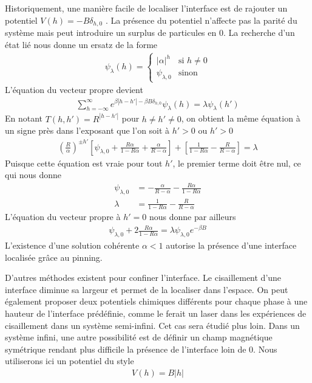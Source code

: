 Historiquement, une manière facile de localiser l'interface est de rajouter un potentiel $V(h) = -B \delta_{h,0}$ \cite{chui}. La présence du potentiel n'affecte pas la parité du système mais peut introduire un surplus de particules en $0$. La recherche d'un état lié nous donne un ersatz de la forme 
\begin{align}
	\psi_\lambda(h) = \begin{cases} |\alpha|^h & \text{si } h \neq 0 \\ \psi_{\lambda,0} & \text{sinon} \end{cases} 
\end{align}
L'équation du vecteur propre devient
\begin{align}
	\sum_{h=-\infty}^\infty e^{\beta |h-h'|- \beta B \delta_{h,0}} \psi_\lambda(h) = \lambda \psi_\lambda(h')
\end{align}
En notant $T(h,h') = R^{|h-h'|}$ pour $h \neq h' \neq 0$,  on obtient la même équation à un signe près dans l'exposant que l'on soit à $h'>0$ ou $h'>0$
\begin{align}
	\left( \frac{R}{\alpha} \right)^{\pm h'} \left[ \psi_{\lambda,0} + \frac{R \alpha}{1 - R \alpha} + \frac{\alpha}{R - \alpha} \right] + \left[ \frac{1}{1-R \alpha} - \frac{R}{R-\alpha} \right] = \lambda
\end{align}
Puisque cette équation est vraie pour tout $h'$, le premier terme doit être nul, ce qui nous donne
\begin{align}
	\psi_{\lambda,0} &= - \frac{\alpha}{R-\alpha}-\frac{R \alpha}{1-R \alpha} \\
	\lambda &= \frac{1}{1-R \alpha} - \frac{R}{R-\alpha}
\end{align}
L'équation du vecteur propre à $h'=0$ nous donne par ailleurs 
\begin{align}
	\psi_{\lambda,0} + 2 \frac{R \alpha}{1-R \alpha} = \lambda \psi_{\lambda,0} e^{-\beta B}
\end{align}
L'existence d'une solution cohérente $\alpha < 1$ autorise la présence d'une interface localisée grâce au pinning.

D'autres méthodes existent pour confiner l'interface. Le cisaillement d'une interface diminue sa largeur et permet de la localiser dans l'espace. On peut également proposer deux potentiels chimiques différents pour chaque phase à une hauteur de l'interface prédéfinie, comme le ferait un laser dans les expériences de cisaillement\cite{delville} dans un système semi-infini. Cet cas sera étudié plus loin. Dans un système infini, une autre possibilité est de définir un champ magnétique symétrique rendant plus difficile la présence de l'interface loin de $0$. Nous utiliserons ici un potentiel du style
\begin{align}
		  V(h) = B |h|
\end{align}

